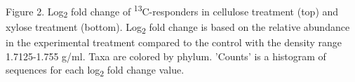 Figure 2.  Log\textsubscript{2} fold change of \textsuperscript{13}C-responders in cellulose treatment (top) and xylose treatment (bottom).  Log\textsubscript{2} fold change is based on the relative abundance in the experimental treatment compared to the control with the density range 1.7125-1.755 g/ml. Taxa are colored by phylum. 'Counts' is a histogram of sequences for each log\textsubscript{2} fold change value.    